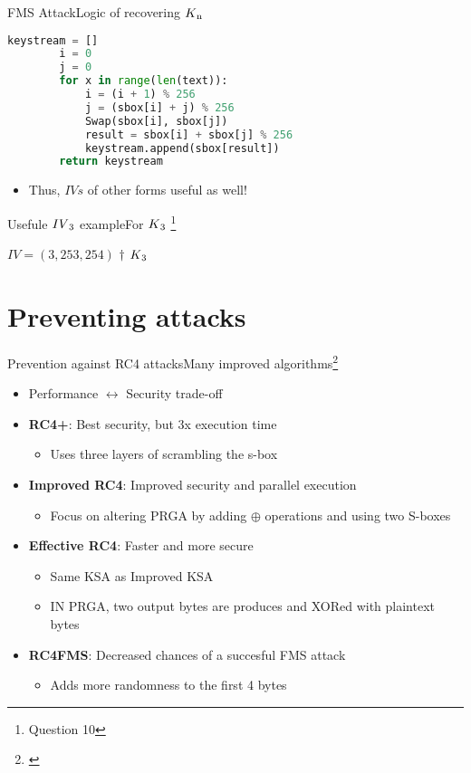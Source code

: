\documentclass[
	aspectratio=169,	%
	onlytextwidth,		%
	t					%
	]{beamer}
\begin{document}
\begin{frame}[fragile]{FMS Attack}{Logic of recovering $K\textsubscript{n}$}

	\begin{lstlisting}[language=Python]
		keystream = []
		i = 0
		j = 0
		for x in range(len(text)):
			i = (i + 1) % 256
			j = (sbox[i] + j) % 256
			Swap(sbox[i], sbox[j])
			result = sbox[i] + sbox[j] % 256
			keystream.append(sbox[result])   
		return keystream   
	\end{lstlisting}
	\begin{itemize}
		\item Thus, $IVs$ of other forms useful as well!
	\end{itemize}
\end{frame}

\begin{frame}[fragile]{Usefule $IV\textsubscript{3}$ example}{For $K\textsubscript{3}$ \footnote[frame]{\footnotesize Question 10}}
	\begin{itemize}
		$IV=(3,253,254)$ $\dagger$ $K\textsubscript{3}$ 
	\end{itemize}
\end{frame}

\section{Preventing attacks}

\begin{frame}[fragile]{Prevention against RC4 attacks}{Many improved algorithms\footnote[frame]{\cite{jindal2017optimization}}}
	\begin{itemize}
		\item Performance $\leftrightarrow$ Security trade-off
		\item \textbf{RC4+}: Best security, but 3x execution time
		\begin{itemize}
			\item Uses three layers of scrambling the s-box 
		\end{itemize}
		\item \textbf{Improved RC4}: Improved security and parallel execution
		\begin{itemize}
			\item Focus on altering PRGA by adding $\oplus$ operations and using two S-boxes
		\end{itemize}
		\item \textbf{Effective RC4}: Faster and more secure
		\begin{itemize}
			\item Same KSA as Improved KSA 
			\item IN PRGA, two output bytes are produces and XORed with plaintext bytes
		\end{itemize}
		\item \textbf{RC4FMS}: Decreased chances of a succesful FMS attack
		\begin{itemize}
			\item Adds more randomness to the first 4 bytes 
		\end{itemize}
	\end{itemize}
\end{frame}
\end{document}

